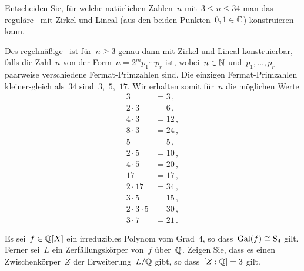 \documentclass{scrartcl}
\begin{document}
\begin{exercise}[subtitle = {Erstklausur~18/19}]
  Entscheiden Sie, für welche natürlichen Zahlen~$n$ mit~$3 \leq n \leq 34$ man das reguläre~ mit Zirkel und Lineal (aus den beiden Punkten~$0,1 \in \mathbb{C}$) konstruieren kann.
\end{exercise}

\begin{solution}
  Des regelmäßige~ ist für~$n \geq 3$ genau dann mit Zirkel und Lineal konstruierbar, falls die Zahl~$n$ von der Form~$n = 2^m p_1 \dotsm p_r$ ist, wobei~$n \in \mathbb{N}$ und~$p_1, \dotsc, p_r$ paarweise verschiedene Fermat-Primzahlen sind.
  Die einzigen Fermat-Primzahlen kleiner-gleich als~$34$ sind~$3$,~$5$,~$17$.
  Wir erhalten somit für~$n$ die möglichen Werte
  \begin{align*}
    3 &= 3 \,,
    \\
    2 \cdot 3 &= 6 \,,
    \\
    4 \cdot 3 &= 12 \,,
    \\
    8 \cdot 3 &= 24 \,,
    \\
    5 &= 5 \,,
    \\
    2 \cdot 5 &= 10 \,,
    \\
    4 \cdot 5 &= 20 \,,
    \\
    17 &= 17 \,,
    \\
    2 \cdot 17 &= 34 \,,
    \\
    3 \cdot 5 &= 15 \,,
    \\
    2 \cdot 3 \cdot 5 &= 30 \,,
    \\
    3 \cdot 7 &= 21 \,.
  \end{align*}
\end{solution}

\begin{exercise}[subtitle = {Erstklausur~18/19}]
  Es sei~$f \in \mathbb{Q}[X]$ ein irreduzibles Polynom vom Grad~$4$, so dass~$\operatorname{Gal}(f) \cong \operatorname{S}_4$ gilt.
  Ferner sei~$L$ ein Zerfällungskörper von~$f$ über~$\mathbb{Q}$.
  Zeigen Sie, dass es einen Zwischenkörper~$Z$ der Erweiterung~$L / \mathbb{Q}$ gibt, so dass~$[Z : \mathbb{Q}] = 3$ gilt.
\end{exercise}
\end{document}
